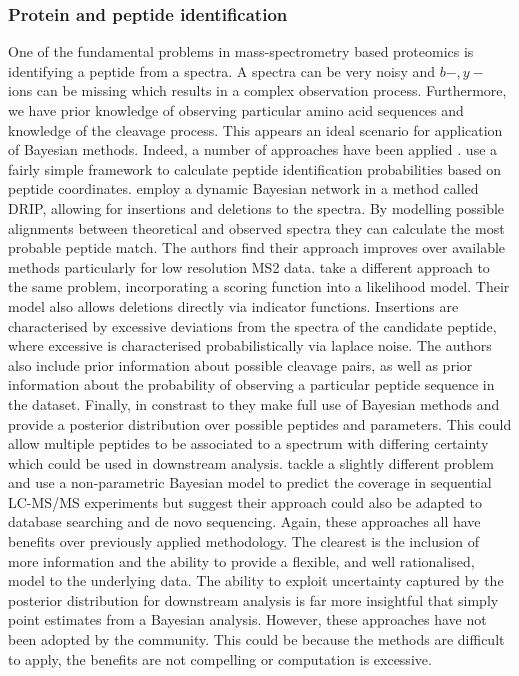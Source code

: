 \documentclass[12pt,english, journal=jpr, layout=twocolumn]{article}
\begin{document}
\subsubsection{Protein and peptide identification}
One of the fundamental problems in mass-spectrometry based proteomics is identifying a peptide from a spectra. A spectra can be very noisy and $b-,y-$ ions can be missing which results in a complex observation process. Furthermore, we have prior knowledge of observing particular amino acid sequences and knowledge of the cleavage process. This appears an ideal scenario for application of Bayesian methods. Indeed, a number of approaches have been applied \citep{Chen::2005, Halloran::2016, Lewis::2018, Claassen::2009}. \citet{Chen::2005} use a fairly simple framework to calculate peptide identification probabilities based on peptide coordinates. \citet{Halloran::2016} employ a dynamic Bayesian network in a method called DRIP, allowing for insertions and deletions to the spectra. By modelling possible alignments between theoretical and observed spectra they can calculate the most probable peptide match. The authors find their approach improves over available methods particularly for low resolution MS2 data. \citet{Lewis::2018} take a different approach to the same problem, incorporating a scoring function into a likelihood model. Their model also allows deletions directly via indicator functions. Insertions are characterised by excessive deviations from the spectra of the candidate peptide, where excessive is characterised probabilistically via laplace noise. The authors also include prior information about possible cleavage pairs, as well as prior information about the probability of observing a particular peptide sequence in the dataset. Finally, in constrast to \citet{Halloran::2016} they make full use of Bayesian methods and provide a posterior distribution over possible peptides and parameters. This could allow multiple peptides to be associated to a spectrum with differing certainty which could be used in downstream analysis. \citet{Claassen::2009} tackle a slightly different problem and use a non-parametric Bayesian model to predict the coverage in sequential LC-MS/MS experiments but suggest their approach could also be adapted to database searching and de novo sequencing. Again, these approaches all have benefits over previously applied methodology. The clearest is the inclusion of more information and the ability to provide a flexible, and well rationalised, model to the underlying data. The ability to exploit uncertainty captured by the posterior distribution for downstream analysis is far more insightful that simply point estimates from a Bayesian analysis. However, these approaches have not been adopted by the community. This could be because the methods are difficult to apply, the benefits are not compelling or computation is excessive.
\end{document}
